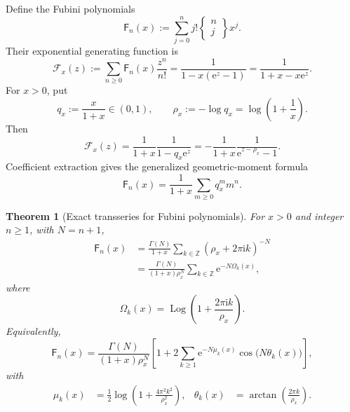 \documentclass[11pt,oneside]{article}
\numberwithin{equation}{section}
\newtheorem{theorem}{Theorem}[section]
\newcommand{\e}{\mathrm e}
\newcommand{\ii}{\mathrm i}
\newcommand{\Z}{\mathbb Z}
\newcommand{\Fub}{\mathsf F}
\newcommand{\Log}{\operatorname{Log}}
\newcommand{\StirlingTwo}[2]{\left\{\!\begin{matrix}#1\\#2\end{matrix}\!\right\}}
\newcommand{\paren}[1]{\left(#1\right)}
\begin{document}
Define the Fubini polynomials
\begin{equation}
 \Fub_n(x):=\sum_{j=0}^{n}j!\StirlingTwo{n}{j}x^j.
 \label{eq:fubini-polynomial-definition}
\end{equation}
Their exponential generating function is
\begin{equation}
 \mathcal F_x(z)
 :=\sum_{n\ge0}\Fub_n(x)\frac{z^n}{n!}
 =\frac{1}{1-x(\e^z-1)}
 =\frac{1}{1+x-x\e^z}.
 \label{eq:fubini-polynomial-egf}
\end{equation}
For \(x>0\), put
\begin{equation}
 q_x:=\frac{x}{1+x}\in(0,1),
 \qquad
 \rho_x:=-\log q_x=\log\!\paren{1+\frac1x}.
 \label{eq:rho-x}
\end{equation}
Then
\begin{equation}
 \mathcal F_x(z)
 =\frac{1}{1+x}\frac{1}{1-q_x\e^z}
 =-\frac{1}{1+x}\frac{1}{\e^{z-\rho_x}-1}.
 \label{eq:fubini-polynomial-geometric}
\end{equation}
Coefficient extraction gives the generalized geometric-moment formula
\begin{equation}
 \Fub_n(x)=\frac{1}{1+x}\sum_{m\ge0}q_x^m m^n.
 \label{eq:fubini-polynomial-dobinski}
\end{equation}

\begin{theorem}[Exact transseries for Fubini polynomials]
\label{thm:fubini-polynomial-transseries}
For \(x>0\) and integer \(n\ge1\), with \(N=n+1\),
\begin{align}
 \Fub_n(x)
 &=\frac{\Gamma(N)}{1+x}
 \sum_{k\in\Z}(\rho_x+2\pi\ii k)^{-N}
 \label{eq:fubini-x-pole}\\
 &=\frac{\Gamma(N)}{(1+x)\rho_x^N}
 \sum_{k\in\Z}\e^{-N\Omega_k(x)},
 \label{eq:fubini-x-complex}
\end{align}
where
\begin{equation}
 \Omega_k(x)=\Log\!\paren{1+\frac{2\pi\ii k}{\rho_x}}.
 \label{eq:fubini-x-action}
\end{equation}
Equivalently,
\begin{equation}
 \Fub_n(x)=\frac{\Gamma(N)}{(1+x)\rho_x^N}
 \left[1+2\sum_{k\ge1}
 \e^{-N\mu_k(x)}\cos\!\bigl(N\theta_k(x)\bigr)\right],
 \label{eq:fubini-x-real}
\end{equation}
with
\begin{align}
 \mu_k(x)&=\frac12\log\!\paren{1+\frac{4\pi^2k^2}{\rho_x^2}},
 &\theta_k(x)&=\arctan\!\paren{\frac{2\pi k}{\rho_x}}.
 \label{eq:fubini-x-mu-theta}
\end{align}
\end{theorem}
\end{document}
